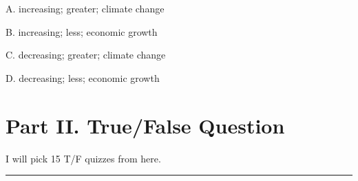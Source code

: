 \documentclass[
]{book}
\begin{document}
\begin{enumerate}
  A. increasing; greater; climate change

  B. increasing; less; economic growth

  C. decreasing; greater; climate change

  D. decreasing; less; economic growth
\end{enumerate}

\hypertarget{part-ii.-truefalse-question}{%
\section*{Part II. True/False Question}\label{part-ii.-truefalse-question}}

I will pick 15 T/F quizzes from here.

\begin{center}\rule{0.5\linewidth}{0.5pt}\end{center}
\end{document}
